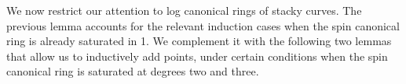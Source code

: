 \documentclass{amsart}
\theoremstyle{plain}
\newtheorem{cor}[thm]{Corollary}
\theoremstyle{definition}
\theoremstyle{remark}
\numberwithin{equation}{section}
\newcommand \sx{\mathscr X}
\newcommand \halfcan{L}
\begin{document}

We now restrict our attention to log canonical rings of stacky curves.  The previous lemma accounts for the relevant induction cases when the spin canonical ring is already saturated in 1.  We complement it with the following two lemmas that allow us to inductively add points, under certain conditions when the spin canonical ring is saturated at degrees two and three.
\end{document}
